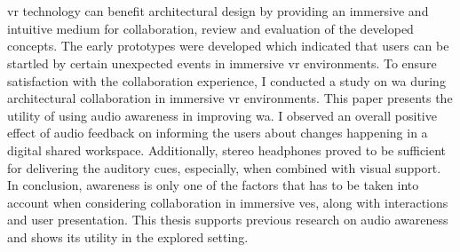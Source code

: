 \chapter{\abstractname}

\gls{vr} technology can benefit architectural design by providing an immersive and intuitive medium for collaboration, review and evaluation of the developed concepts.
The early prototypes were developed which indicated that users can be startled by certain unexpected events in immersive \gls{vr} environments.
To ensure satisfaction with the collaboration experience, I conducted a study on \gls{wa} during architectural collaboration in immersive \gls{vr} environments.
This paper presents the utility of using audio awareness in improving \gls{wa}.
I observed an overall positive effect of audio feedback on informing the users about changes happening in a digital shared workspace. Additionally, stereo headphones proved to be sufficient for delivering the auditory cues, especially, when combined with visual support.
In conclusion, awareness is only one of the factors that has to be taken into account when considering collaboration in immersive \glspl{ve}, along with interactions and user presentation.
This thesis supports previous research on audio awareness and shows its utility in the explored setting.

\begin{comment}
However, this immersiveness in combination with the inherently limited perceptual information available in \glspl{ve} creates a bizarre situation, where on one hand, the visual information is very convincing, but on the other, the familiar perceptual feedbacks from the environment and our own actions are stripped away.
Starting with the question of how this situation affects the satisfaction with collaboration experience, I arrive at the concept of \gls{wa}. I build upon the design of a previous study on \gls{wa} from the field of \gls{cscw} and adapt it into a study of architectural collaboration in an immersive \gls{vr} environment. 
The results of the conducted experiments support previous research and show the high benefit of using additional audio feedback to support \gls{wa}.
\end{comment}


